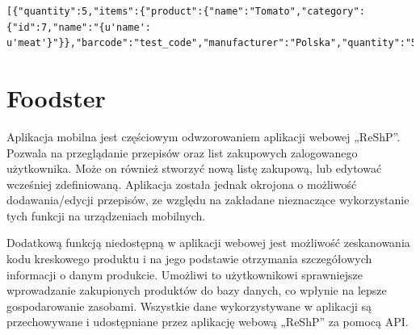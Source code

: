 \documentclass{article}
\begin{document}
\begin{lstlisting}[label=product_api,caption=Pobranie produktów,breaklines=true]
[{"quantity":5,"items":{"product":{"name":"Tomato","category":{"id":7,"name":"{u'name': u'meat'}"}},"barcode":"test_code","manufacturer":"Polska","quantity":"5.00"}}]
\end{lstlisting}

\section{Foodster}
Aplikacja mobilna jest częściowym odwzorowaniem aplikacji webowej „ReShP”. Pozwala na przeglądanie przepisów oraz list zakupowych zalogowanego użytkownika. Może on również stworzyć nową listę zakupową, lub edytować wcześniej zdefiniowaną. Aplikacja została jednak okrojona o możliwość dodawania/edycji przepisów, ze względu na zakładane nieznaczące wykorzystanie tych funkcji na urządzeniach mobilnych. \par
Dodatkową funkcją niedostępną w aplikacji webowej jest możliwość zeskanowania kodu kreskowego produktu i na jego podstawie otrzymania szczegółowych informacji o danym produkcie. Umożliwi to użytkownikowi sprawniejsze wprowadzanie zakupionych produktów do bazy danych, co wpłynie na lepsze gospodarowanie zasobami. Wszystkie dane wykorzystywane w aplikacji są przechowywane i udostępniane przez aplikację webową „ReShP” za pomocą API.
\end{document}
